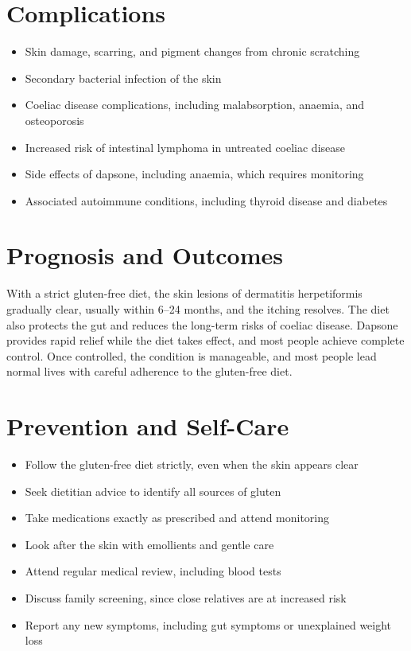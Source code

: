 \section*{Complications}
\begin{itemize}
    \item Skin damage, scarring, and pigment changes from chronic scratching
    \item Secondary bacterial infection of the skin
    \item Coeliac disease complications, including malabsorption, anaemia, and osteoporosis
    \item Increased risk of intestinal lymphoma in untreated coeliac disease
    \item Side effects of dapsone, including anaemia, which requires monitoring
    \item Associated autoimmune conditions, including thyroid disease and diabetes
\end{itemize}

\section*{Prognosis and Outcomes}
With a strict gluten-free diet, the skin lesions of dermatitis herpetiformis gradually clear, usually within 6--24 months, and the itching resolves. The diet also protects the gut and reduces the long-term risks of coeliac disease. Dapsone provides rapid relief while the diet takes effect, and most people achieve complete control. Once controlled, the condition is manageable, and most people lead normal lives with careful adherence to the gluten-free diet.

\section*{Prevention and Self-Care}
\begin{itemize}
    \item Follow the gluten-free diet strictly, even when the skin appears clear
    \item Seek dietitian advice to identify all sources of gluten
    \item Take medications exactly as prescribed and attend monitoring
    \item Look after the skin with emollients and gentle care
    \item Attend regular medical review, including blood tests
    \item Discuss family screening, since close relatives are at increased risk
    \item Report any new symptoms, including gut symptoms or unexplained weight loss
\end{itemize}

